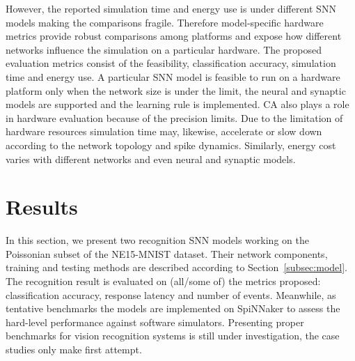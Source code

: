 \documentclass{frontiersENG} %
\begin{document}
However, the reported simulation time and energy use is under different SNN models making the comparisons fragile.
Therefore model-specific hardware metrics provide robust comparisons among platforms and expose how different networks influence the simulation on a particular hardware.
The proposed evaluation metrics consist of the feasibility, classification accuracy, simulation time and energy use.
A particular SNN model is feasible to run on a hardware platform only when the  network size is under the limit, the neural and synaptic models are supported and the learning rule is implemented.
CA also plays a role in hardware evaluation because of the precision limits.
Due to the limitation of hardware resources simulation time may, likewise, accelerate or slow down according to the network topology and spike dynamics.
Similarly, energy cost varies with different networks and even neural and synaptic models.

\section{Results}
\label{sec:test}
In this section, we present two recognition SNN models working on the Poissonian subset of the NE15-MNIST dataset.
Their network components, training and testing methods are described according to Section~\ref{subsec:model}.
The recognition result is evaluated on (all/some of) the metrics proposed: classification accuracy, response latency and number of events.
Meanwhile, as tentative benchmarks the models are implemented on SpiNNaker to assess the hard-level performance against software simulators.
Presenting proper benchmarks for vision recognition systems is still under investigation, the case studies only make first attempt.
\end{document}
